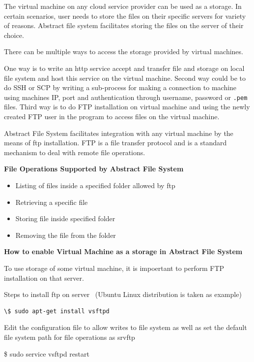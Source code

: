 The virtual machine on any cloud service provider can be used as a storage. In 
certain scenarios, user needs to store the files on their specific servers for 
variety of reasons. Abstract file system facilitates storing the files on the 
server of their choice.

There can be multiple ways to access the storage provided by virtual machines. 

One way is to write an http service accept and transfer file and storage on 
local file system and host this service on the virtual machine. Second way 
could be to do SSH or SCP by writing a sub-process for making a connection to 
machine using machines IP, port and authentication through username, 
password or \verb|.pem| files. Third way is to do FTP installation on virtual 
machine and using the newly created FTP user in the program to access files on 
the virtual machine.


Abstract File System facilitates integration with any virtual machine by the 
means of ftp installation. FTP is a file transfer protocol and is a standard 
mechanism to deal with remote file operations.


\textbf{File Operations Supported by Abstract File System }
\begin{itemize}
    \item  Listing of files inside a specified folder allowed by ftp
    \item  Retrieving a specific file 
    \item  Storing file inside specified folder
    \item  Removing the file from the folder
\end{itemize}   

\textbf{How to enable Virtual Machine as a storage in Abstract File System}

To use storage of some virtual machine, it is impoertant to perform 
FTP installation on that server. 

Steps to install ftp on server~\cite{hid-sp18-420-FTP}
(Ubuntu Linux distribution is taken as example)

\begin{verbatim}
\$ sudo apt-get install vsftpd
\end{verbatim}

Edit the configuration file to allow writes to file system as well as set the 
default file system path for file operations as \/srv\/ftp


\$ sudo service vsftpd restart


